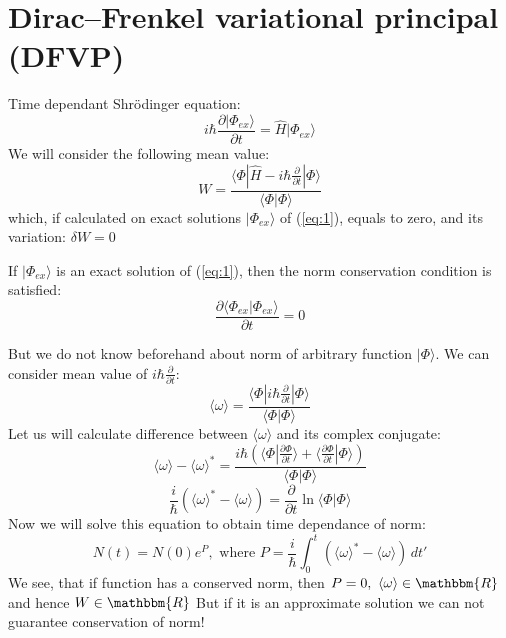 \documentclass[a4paper,14pt]{extarticle}
\begin{document}
\section{Dirac--Frenkel variational principal (DFVP)}
Time dependant Shr\"{o}dinger equation:
\begin{equation}
i\hbar\frac{\partial |\Phi_{ex}\rangle}{\partial t} = \hat{H}|\Phi_{ex}\rangle
\label{eq:1}
\end{equation}
We will consider the following mean value:
$$W=\frac{ \langle \Phi| \hat{H} - i\hbar\frac{\partial}{\partial t} | \Phi \rangle }{\langle\Phi|\Phi\rangle}$$
which, if calculated on exact solutions $|\Phi_{ex}\rangle$ of (\ref{eq:1}), equals to zero, and its variation: $\delta W = 0$

If $|\Phi_{ex}\rangle$ is an exact solution of (\ref{eq:1}), then the norm conservation condition is satisfied:
$$\frac{\partial \langle\Phi_{ex}|\Phi_{ex}\rangle }{\partial t} = 0$$

But we do not know beforehand about norm of arbitrary function $|\Phi\rangle$.
We can consider mean value of $i\hbar\frac{\partial}{\partial t}$:
$$\langle\omega\rangle = \frac{ \langle \Phi | i\hbar\frac{\partial}{\partial t} | \Phi \rangle }{\langle\Phi|\Phi\rangle}$$
Let us will calculate difference between $\langle\omega\rangle$ and its complex conjugate:
$$\langle\omega\rangle-\langle\omega\rangle^* = \frac{i\hbar( \langle\Phi|\frac{\partial \Phi}{\partial t}\rangle + %
							      \langle\frac{\partial \Phi}{\partial t}|\Phi\rangle )}%
						     {\langle\Phi|\Phi\rangle}$$
$$\frac{i}{\hbar}\left(\langle\omega\rangle^*-\langle\omega\rangle\right) = \frac{\partial}{\partial t}\ln\langle\Phi|\Phi\rangle$$
Now we will solve this equation to obtain time dependance of norm:
$$N(t) = N(0)e^P,\text{ where } P = \frac{i}{\hbar}\int_0^t\left(\langle\omega\rangle^*-\langle\omega\rangle\right)\,dt'$$
We see, that if function has a conserved norm, then $P=0,\ \langle\omega\rangle\in\mathbbm{R}$ and hence $W\in\mathbbm{R}$
But if it is an approximate solution we can not guarantee conservation of norm!
\end{document}
